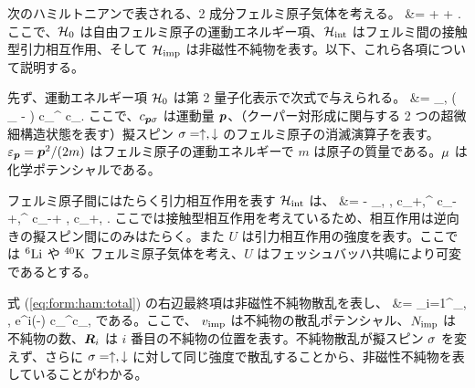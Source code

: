 
次のハミルトニアンで表される、2 成分フェルミ原子気体を考える。
\beq
\hanaH &= \Hkin + \Hint + \Himp.\label{eq:form:ham:total}
\eeq
ここで、$\mathcal{H}_0$ は自由フェルミ原子の運動エネルギー項、$\mathcal{H}_{\text{int}}$ はフェルミ間の接触型引力相互作用、そして $\mathcal{H}_{\text{imp}}$ は非磁性不純物を表す。以下、これら各項について説明する。

先ず、運動エネルギー項 $\mathcal{H}_0$ は第 2 量子化表示で次式で与えられる。
\beq
&\Hkin =  \sum_{\bp, \spin} \left( \ken_{\bp} - \cpt \right) c_{\bp \spin}^{\dag} c_{\bp \spin}. \label{eq:form:ham:hkin}
\eeq
ここで、$c_{\bm{p} \sigma}$ は運動量 $\bm{p}$、（クーパー対形成に関与する 2 つの超微細構造状態を表す）擬スピン $\sigma = \uparrow, \downarrow$ のフェルミ原子の消滅演算子を表す。$\varepsilon_{\bm{p}} = \bm{p}^2 / (2m)$ はフェルミ原子の運動エネルギーで $m$ は原子の質量である。$\mu$ は化学ポテンシャルである。


フェルミ原子間にはたらく引力相互作用を表す $\mathcal{H}_{\text{int}}$ は、
\beq
&\Hint = - \uint \sum_{\bp, \bpp, \bq}c_{\bp+\bqt,\uar}^{\dag} c_{-\bp+\bqt,\dar}^{\dag} c_{-\bpp + \bqt, \dar} c_{\bpp+\bqt, \uar}.\label{eq:form:ham:hint}
\eeq
ここでは接触型相互作用を考えているため、相互作用は逆向きの擬スピン間にのみはたらく。また $U$ は引力相互作用の強度を表す。ここでは ${}^6\mathrm{Li}$ や ${}^{40}\mathrm{K}$ フェルミ原子気体を考え、$U$ はフェッシュバッハ共鳴により可変であるとする。

式 (\ref{eq:form:ham:total}) の右辺最終項は非磁性不純物散乱を表し、
\beq
&\Himp =  \sum_{i=1}^{\Nimp}\sum_{\bp, \bpp, \spin} e^{i(\bp-\bpp)\cdot \bri} \vimp c_{\bp\spin}^{\dag}c_{\bpp \spin},\label{eq:form:ham:himp}
\eeq
である。ここで、 $v_{\text{imp}}$ は不純物の散乱ポテンシャル、$N_{\text{imp}}$ は不純物の数、$\bm{R}_i$ は $i$ 番目の不純物の位置を表す。不純物散乱が擬スピン $\sigma$ を変えず、さらに $\sigma=\uparrow, \downarrow$  に対して同じ強度で散乱することから、非磁性不純物を表していることがわかる。

